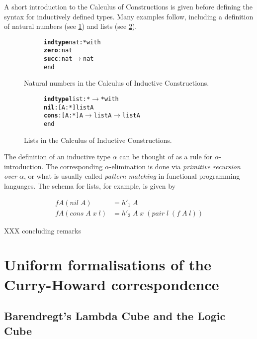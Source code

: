 \documentclass[12pt,toc=bibliography,numbers=noendperiod,
               footnotes=multiple,twoside]{scrartcl}
\begin{document}
A short introduction to the Calculus of Constructions is given before defining the syntax for inductively defined types. Many examples follow, including a definition of natural numbers (see \cref{fig:nat-inductive-type}) and lists (see \cref{fig:list-inductive-type}).

\begin{figure}[h]
\centering
\begin{subfigure}[t]{0.3\linewidth}
\begin{alltt}
\textbf{indtype} nat : * with
    \textbf{zero} : nat
    \textbf{succ} : nat \(\rightarrow\) nat
end
\end{alltt}
\end{subfigure}
\caption{Natural numbers in the Calculus of Inductive Constructions.}
\label{fig:nat-inductive-type}
\end{figure}

\begin{figure}[h]
\centering
\begin{subfigure}[t]{0.4\linewidth}
\begin{alltt}
\textbf{indtype} list : * \(\rightarrow\) * with
    \textbf{nil}  : [A : *] list A
    \textbf{cons} : [A : *] A \(\rightarrow\) list A \(\rightarrow\) list A
end
\end{alltt}
\end{subfigure}
\caption{Lists in the Calculus of Inductive Constructions.}
\label{fig:list-inductive-type}
\end{figure}

The definition of an inductive type \(\alpha\) can be thought of as a rule for \(\alpha\)-introduction. The corresponding \(\alpha\)-elimination is done via \emph{primitive recursion over \(\alpha\)}, or what is usually called \emph{pattern matching} in functional programming languages. The schema for lists, for example, is given by

\begin{align*}
f A (\textit{nil}\;A) &= h'_1\;A \\
f A (\textit{cons}\;A\;x\;l) &= h'_2\;A\;x\;(\textit{pair}\;l\;(f\;A\;l))
\end{align*}

XXX concluding remarks


\section{Uniform formalisations of the Curry-Howard correspondence}

\subsection{\label{ssc:cubes}Barendregt's Lambda Cube and the Logic Cube}
\end{document}
